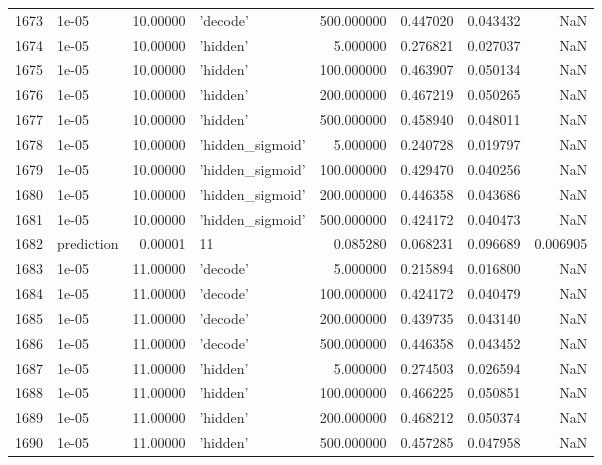\documentclass[10pt,a4paper]{article}
\begin{document}
\begin{tabular}{llrlrrrr}
1673 &       1e-05 &  10.00000 &           'decode' &  500.000000 &  0.447020 &  0.043432 &       NaN \\
1674 &       1e-05 &  10.00000 &           'hidden' &    5.000000 &  0.276821 &  0.027037 &       NaN \\
1675 &       1e-05 &  10.00000 &           'hidden' &  100.000000 &  0.463907 &  0.050134 &       NaN \\
1676 &       1e-05 &  10.00000 &           'hidden' &  200.000000 &  0.467219 &  0.050265 &       NaN \\
1677 &       1e-05 &  10.00000 &           'hidden' &  500.000000 &  0.458940 &  0.048011 &       NaN \\
1678 &       1e-05 &  10.00000 &   'hidden\_sigmoid' &    5.000000 &  0.240728 &  0.019797 &       NaN \\
1679 &       1e-05 &  10.00000 &   'hidden\_sigmoid' &  100.000000 &  0.429470 &  0.040256 &       NaN \\
1680 &       1e-05 &  10.00000 &   'hidden\_sigmoid' &  200.000000 &  0.446358 &  0.043686 &       NaN \\
1681 &       1e-05 &  10.00000 &   'hidden\_sigmoid' &  500.000000 &  0.424172 &  0.040473 &       NaN \\
1682 &  prediction &   0.00001 &                 11 &    0.085280 &  0.068231 &  0.096689 &  0.006905 \\
1683 &       1e-05 &  11.00000 &           'decode' &    5.000000 &  0.215894 &  0.016800 &       NaN \\
1684 &       1e-05 &  11.00000 &           'decode' &  100.000000 &  0.424172 &  0.040479 &       NaN \\
1685 &       1e-05 &  11.00000 &           'decode' &  200.000000 &  0.439735 &  0.043140 &       NaN \\
1686 &       1e-05 &  11.00000 &           'decode' &  500.000000 &  0.446358 &  0.043452 &       NaN \\
1687 &       1e-05 &  11.00000 &           'hidden' &    5.000000 &  0.274503 &  0.026594 &       NaN \\
1688 &       1e-05 &  11.00000 &           'hidden' &  100.000000 &  0.466225 &  0.050851 &       NaN \\
1689 &       1e-05 &  11.00000 &           'hidden' &  200.000000 &  0.468212 &  0.050374 &       NaN \\
1690 &       1e-05 &  11.00000 &           'hidden' &  500.000000 &  0.457285 &  0.047958 &       NaN \\

\end{tabular}
\end{document}
